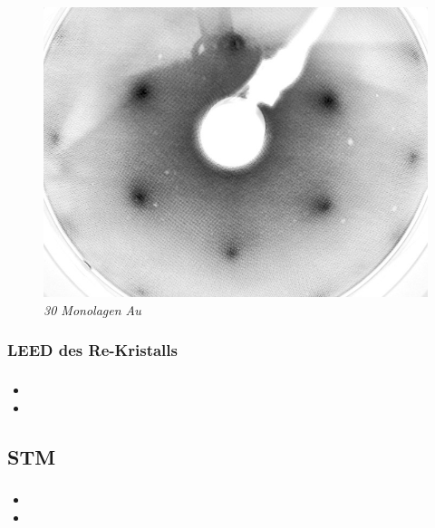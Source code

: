 \documentclass{beamer}
\begin{document}
\begin{frame}
\begin{minipage}{\linewidth}
\begin{figure}[H]
\begin{minipage}[b]{0.3\textwidth}
		\includegraphics[width=\textwidth]{bilder/30ML_E208}
		\caption*{\textit{30 Monolagen Au}}
		\label{30ML} 
	\end{minipage}
\end{figure}
\end{minipage}
\end{frame}

\begin{frame}
\frametitle{LEED des Re-Kristalls}
\end{frame}

\begin{frame}
\frametitle{}
\begin{itemize}
  \item
  \item
\end{itemize}
\end{frame}



\subsection[Ergebnisse]{STM}

\begin{frame}
\frametitle{}
\begin{itemize}
  \item
  \item
\end{itemize}
\end{frame}
\end{document}
